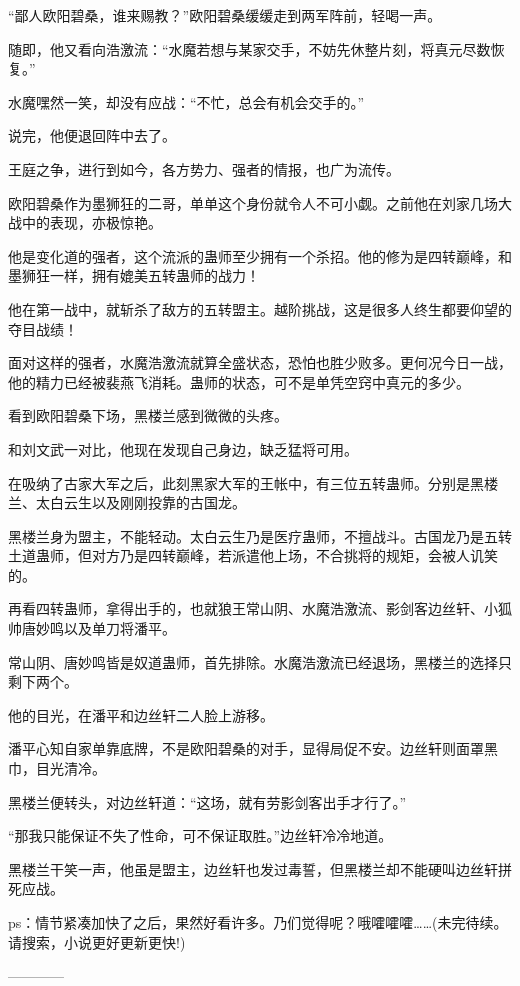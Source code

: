 \begin{this_body}
“鄙人欧阳碧桑，谁来赐教？”欧阳碧桑缓缓走到两军阵前，轻喝一声。

随即，他又看向浩激流：“水魔若想与某家交手，不妨先休整片刻，将真元尽数恢复。”

水魔嘿然一笑，却没有应战：“不忙，总会有机会交手的。”

说完，他便退回阵中去了。

王庭之争，进行到如今，各方势力、强者的情报，也广为流传。

欧阳碧桑作为墨狮狂的二哥，单单这个身份就令人不可小觑。之前他在刘家几场大战中的表现，亦极惊艳。

他是变化道的强者，这个流派的蛊师至少拥有一个杀招。他的修为是四转巅峰，和墨狮狂一样，拥有媲美五转蛊师的战力！

他在第一战中，就斩杀了敌方的五转盟主。越阶挑战，这是很多人终生都要仰望的夺目战绩！

面对这样的强者，水魔浩激流就算全盛状态，恐怕也胜少败多。更何况今日一战，他的精力已经被裴燕飞消耗。蛊师的状态，可不是单凭空窍中真元的多少。

看到欧阳碧桑下场，黑楼兰感到微微的头疼。

和刘文武一对比，他现在发现自己身边，缺乏猛将可用。

在吸纳了古家大军之后，此刻黑家大军的王帐中，有三位五转蛊师。分别是黑楼兰、太白云生以及刚刚投靠的古国龙。

黑楼兰身为盟主，不能轻动。太白云生乃是医疗蛊师，不擅战斗。古国龙乃是五转土道蛊师，但对方乃是四转巅峰，若派遣他上场，不合挑将的规矩，会被人讥笑的。

再看四转蛊师，拿得出手的，也就狼王常山阴、水魔浩激流、影剑客边丝轩、小狐帅唐妙鸣以及单刀将潘平。

常山阴、唐妙鸣皆是奴道蛊师，首先排除。水魔浩激流已经退场，黑楼兰的选择只剩下两个。

他的目光，在潘平和边丝轩二人脸上游移。

潘平心知自家单靠底牌，不是欧阳碧桑的对手，显得局促不安。边丝轩则面罩黑巾，目光清冷。

黑楼兰便转头，对边丝轩道：“这场，就有劳影剑客出手才行了。”

“那我只能保证不失了性命，可不保证取胜。”边丝轩冷冷地道。

黑楼兰干笑一声，他虽是盟主，边丝轩也发过毒誓，但黑楼兰却不能硬叫边丝轩拼死应战。

ps：情节紧凑加快了之后，果然好看许多。乃们觉得呢？哦嚯嚯嚯……(未完待续。请搜索，小说更好更新更快!)

------------

\end{this_body}

